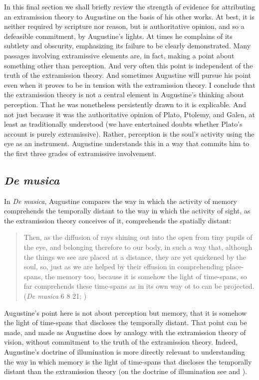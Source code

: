 \documentclass[12pt]{article}
\begin{document}
In this final section we shall briefly review the strength of evidence for attributing an extramission theory to Augustine on the basis of his other works. At best, it is neither required by scripture nor reason, but is authoritative opinion, and so a defeasible commitment, by Augustine's lights. At times he complains of its subtlety and obscurity, emphasizing its failure to be clearly demonstrated. Many passages involving extramissive elements are, in fact, making a point about something other than perception. And very often this point is independent of the truth of the extramission theory. And sometimes Augustine will pursue his point even when it proves to be in tension with the extramission theory. I conclude that the extramission theory is not a central element in Augustine's thinking about perception. That he was nonetheless persistently drawn to it is explicable. And not just because it was the authoritative opinion of Plato, Ptolemy, and Galen, at least as traditionally understood (we have entertained doubts whether Plato's account is purely extramissive). Rather, perception is the soul's activity using the eye as an instrument. Augustine understands this in a way that commits him to the first three grades of extramissive involvement. 

\subsection{\emph{De musica}} %
\label{sub:de_musica}

In \emph{De musica}, Augustine compares the way in which the activity of memory comprehends the temporally distant to the way in which the activity of sight, as the extramission theory conceives of it, comprehends the spatially distant:
\begin{quote}
	Then, as the diffusion of rays shining out into the open from tiny pupils of the eye, and belonging therefore to our body, in such a way that, although the things we see are placed at a distance, they are yet quickened by the soul, so, just as we are helped by their effusion in comprehending place-spans, the memory too, because it is somehow the light of time-spans, so far comprehends these time-spans as in its own way ot to can be projected. (\emph{De musica} 6 8 21; \citealt[346]{Taliaferro:1947aa})
\end{quote}
Augustine's point here is not about perception but memory, that it is somehow the light of time-spans that discloses the temporally distant. That point can be made, and made as Augustine does by analogy with the extramission theory of vision, without commitment to the truth of the extramission theory. Indeed, Augustine's doctrine of illumination is more directly relevant to understanding the way in which memory is the light of time-spans that discloses the temporally distant than the extramission theory (on the doctrine of illumination see \citealt{Allers:1952os} and \citealt{Matthews:2014aa}).
\end{document}
